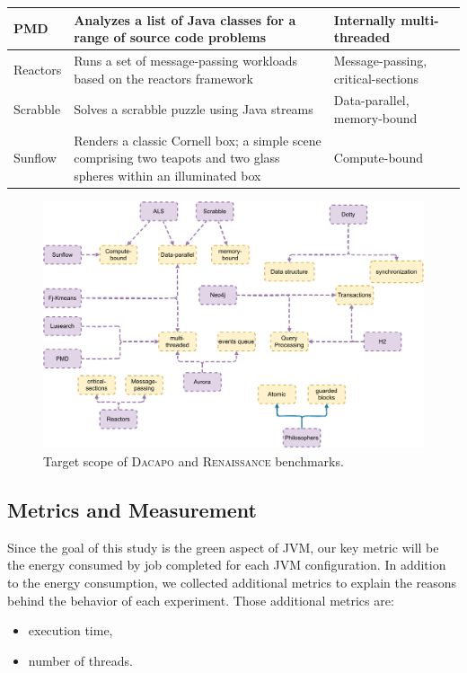 \begin{table}
{\begin{tabular}{|p{0.1\linewidth}|p{0.6\linewidth}|p{0.3\linewidth}|}
            \hline
            \textsf{PMD}          & Analyzes a list of Java classes for a range of source code problems                                                  & Internally multi-threaded                  \\
            \hline
            \textsf{Reactors}     & Runs a set of message-passing workloads based on the reactors framework                                              & Message-passing, critical-sections         \\
            \hline
            \textsf{Scrabble}     & Solves a scrabble puzzle using Java streams                                                                          & Data-parallel, memory-bound                \\
            \hline
            \textsf{Sunflow}      & Renders a classic Cornell box; a simple scene comprising two teapots and two glass spheres within an illuminated box & Compute-bound                              \\
            \hline
        \end{tabular}
    }
\end{table}


\begin{figure}%
    \centering
    \includegraphics[width=\linewidth]{imgs/jvm_benchmarks}
    \caption{Target scope of \textsc{Dacapo} and \textsc{Renaissance} benchmarks.}
    \label{fig:jvm-benchmarks-classification}
\end{figure}

\subsection{Metrics and Measurement}
Since the goal of this study is the green aspect of JVM, our key metric will be the energy consumed by job completed for each JVM configuration.
In addition to the energy consumption, we collected additional metrics to explain the reasons behind the behavior of each experiment.
Those additional metrics are:
\begin{itemize}
    \item execution time,
    \item number of threads.
\end{itemize}


